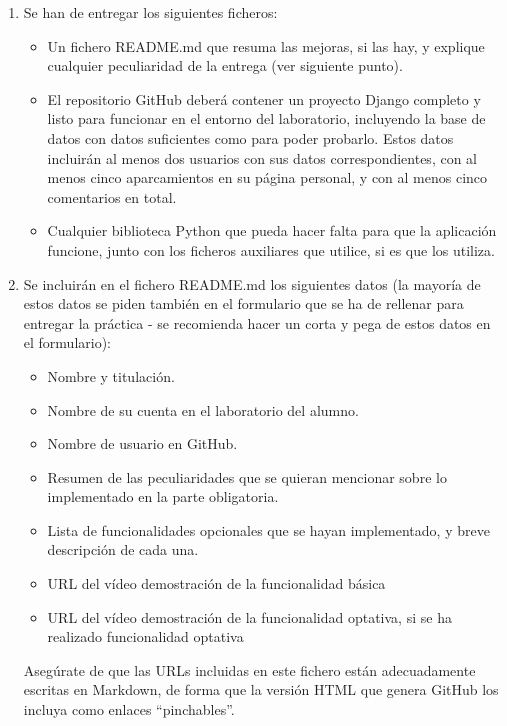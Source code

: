 \begin{enumerate}
  \item Se han de entregar los siguientes ficheros:

\begin{itemize}
  \item Un fichero README.md que resuma las mejoras, si las hay, y explique cualquier peculiaridad de la entrega (ver siguiente punto).
  \item El repositorio GitHub deberá contener un proyecto Django completo y listo para funcionar en el entorno del laboratorio, incluyendo la base de datos con datos suficientes como para poder probarlo. Estos datos incluirán al menos dos usuarios con sus datos correspondientes, con al menos cinco aparcamientos en su página personal, y con al menos cinco comentarios en total.
  \item Cualquier biblioteca Python que pueda hacer falta para que la aplicación funcione, junto con los ficheros auxiliares que utilice, si es que los utiliza.
\end{itemize}

  \item Se incluirán en el fichero README.md los siguientes datos (la mayoría de estos datos se piden también en el formulario que se ha de rellenar para entregar la práctica - se recomienda hacer un corta y pega de estos datos en el formulario):

\begin{itemize}
  \item Nombre y titulación.
  \item Nombre de su cuenta en el laboratorio del alumno.
  \item Nombre de usuario en GitHub.
  \item Resumen de las peculiaridades que se quieran mencionar sobre lo implementado en la parte obligatoria.
  \item Lista de funcionalidades opcionales que se hayan implementado, y breve descripción de cada una.
  \item URL del vídeo demostración de la funcionalidad básica
  \item URL del vídeo demostración de la funcionalidad optativa, si se ha realizado funcionalidad optativa
\end{itemize}

Asegúrate de que las URLs incluidas en este fichero están adecuadamente escritas en Markdown, de forma que la versión HTML que genera GitHub los incluya como enlaces ``pinchables''.

\end{enumerate}


